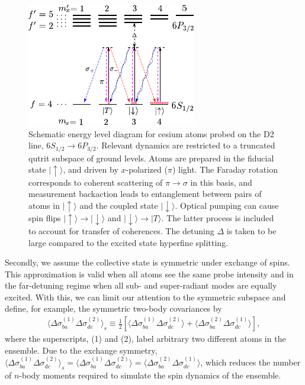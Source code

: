 \documentclass[aps,pra,twocolumn,superscriptaddress]{revtex4-1} %
\def\ket#1{\lvert{#1}\rangle}%
\newcommand{\expect}[1]{\big\langle #1 \big\rangle}
\begin{document}
\begin{figure}[htb]
\centering
  \includegraphics[width=.35\textwidth]{fig/FaradaySqueezingLevelStructure}
  \caption{Schematic energy level diagram for cesium atoms probed on the D2 line, $6S_{1/2} \rightarrow 6P_{3/2}$.  Relevant dynamics are restricted to a truncated qutrit subspace of ground levels.  Atoms are prepared in the fiducial state $\ket{\uparrow}$, and driven by $x$-polarized ($\pi$) light.  The Faraday rotation corresponds to coherent scattering of $\pi \rightarrow \sigma$ in this basis, and measurement backaction leads to entanglement between pairs of atoms in $\ket{\uparrow}$ and the coupled state $\ket{\downarrow}$.  Optical pumping can cause spin flips $\ket{\uparrow} \rightarrow \ket{\downarrow}$ and $ \ket{\downarrow} \rightarrow  \ket{T}$.  The latter process is included to account for transfer of coherences.  The detuning $\Delta$ is taken to be large compared to the excited state hyperfine splitting.}
  \label{fig:spinsqueezinglevelstructure}
\end{figure}

Secondly, we assume the collective state is symmetric under exchange of spins. This approximation is valid when all atoms see the same probe intensity and in the far-detuning regime when all sub- and super-radiant modes are equally excited. With this, we can limit our attention to the symmetric subspace and define, for example, the symmetric two-body covariances by
\begin{align}
\expect{\!\Delta\sigma_{ba}^{(1)}\Delta\sigma_{dc}^{(2)}}_s \!\!\equiv\! \frac{1}{2}\!\left[\expect{\!\Delta\sigma_{ba}^{(1)}\Delta\sigma_{dc}^{(2)}}\!+\!\expect{\!\Delta\sigma_{ba}^{(2)}\Delta\sigma_{dc}^{(1)}} \right] ,
\end{align}
where the superscripts, (1) and (2), label arbitrary two different atoms in the ensemble. Due to the exchange symmetry, $ \expect{\Delta\sigma_{ba}^{(1)}\Delta\sigma_{dc}^{(2)}}_s=\expect{\Delta\sigma_{ba}^{(1)}\Delta\sigma_{dc}^{(2)}}=\expect{\Delta\sigma_{ba}^{(2)}\Delta\sigma_{dc}^{(1)}} $, which reduces the number of $ n $-body moments required to simulate the spin dynamics of the ensemble.
\end{document}
